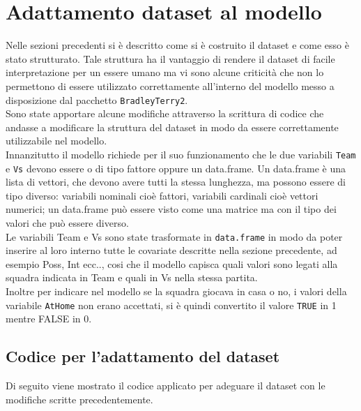 \section{Adattamento dataset al modello}

Nelle sezioni precedenti si è descritto come si è costruito il dataset e come esso è stato strutturato. Tale struttura ha il vantaggio di rendere il dataset di facile interpretazione per un essere umano ma vi sono alcune criticità che non lo permettono di essere utilizzato correttamente all'interno del modello messo a disposizione dal pacchetto \texttt{BradleyTerry2}.\\ 
Sono state apportare alcune modifiche attraverso la scrittura di codice che andasse a modificare la struttura del dataset in modo da essere correttamente utilizzabile nel modello. \\

Innanzitutto il modello richiede per il suo funzionamento che le due variabili \texttt{Team} e \texttt{Vs} devono essere o di tipo fattore oppure un \textsf{data.frame}. Un \textsf{data.frame} è una lista di vettori, che devono avere tutti la stessa lunghezza, ma possono essere di tipo diverso: variabili nominali cioè fattori, variabili cardinali cioè vettori numerici; un \textsf{data.frame} può essere visto come una matrice ma con il tipo dei valori che può essere diverso.\\ 
Le variabili \textsf{Team} e \textsf{Vs} sono state trasformate in \texttt{data.frame} in modo da poter inserire al loro interno tutte le covariate descritte nella sezione precedente, ad esempio \textsf{Poss}, \textsf{Int} ecc.., cosi che il modello capisca quali valori sono legati alla squadra indicata in \textsf{Team} e quali in \textsf{Vs} nella stessa partita.\\

Inoltre per indicare nel modello se la squadra giocava in casa o no, i valori della variabile \texttt{AtHome} non erano accettati, si è quindi convertito il valore \texttt{TRUE} in 1 mentre FALSE in 0.



\subsection{Codice per l'adattamento del dataset}
Di seguito viene mostrato il codice applicato per adeguare il dataset con le modifiche scritte precedentemente.

